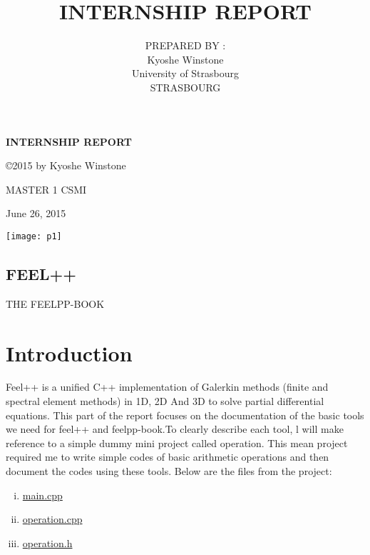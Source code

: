 \documentclass[11pt,utf8]{article}
\title{INTERNSHIP REPORT}
\author{PREPARED BY :\\ Kyoshe Winstone\\University of Strasbourg\\STRASBOURG}
\begin{document}
\begin{center}
\textbf{{\large INTERNSHIP REPORT} }\\ %
\end{center}
\begin{center}
\copyright 2015 by Kyoshe Winstone \\
\end{center}

\begin{center}
MASTER 1 CSMI\\
\end{center}
\begin{center}
June 26, 2015

\end{center}
\begin{center}
 \texttt{[image: p1]}
 \end{center}
 \begin{center}
 
\section*{FEEL++  }
\begin{center}
   THE FEELPP-BOOK
   \end{center}
\label{weekly report of the internship}

\end{center}
\newpage

\section{Introduction}
Feel++ is a unified C++ implementation of Galerkin methods (finite and spectral element methods) in 1D, 2D And 3D to solve partial differential equations.
This part of the report focuses on the documentation of the basic tools we need for feel++ and feelpp-book.To  clearly describe each tool, l will make reference to a simple dummy mini project called operation. This mean project required me to write simple codes of basic arithmetic operations and then document the codes using these tools.
Below are the files from the project:
\begin{enumerate}[i.]
\item  \href{https://github.com/wkyoshe/stageM1/blob/master/src/main.cpp}{main.cpp}
\item \href{https://github.com/wkyoshe/stageM1/blob/master/src/operation.cpp}{operation.cpp}
\item  \href{https://github.com/wkyoshe/stageM1/blob/master/src/operation.h}{operation.h}
\end{enumerate}
\end{document}
